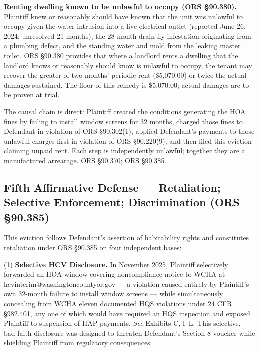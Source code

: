 \documentclass[12pt,letterpaper]{article}
\begin{document}
\textbf{Renting dwelling known to be unlawful to occupy (ORS \S90.380).} Plaintiff knew or reasonably should have known that the unit was unlawful to occupy given the water intrusion into a live electrical outlet (reported June 26, 2024; unresolved 21 months), the 28-month drain fly infestation originating from a plumbing defect, and the standing water and mold from the leaking master toilet. ORS \S90.380 provides that where a landlord rents a dwelling that the landlord knows or reasonably should know is unlawful to occupy, the tenant may recover the greater of two months' periodic rent (\$5,070.00) or twice the actual damages sustained. The floor of this remedy is \$5,070.00; actual damages are to be proven at trial.

The causal chain is direct: Plaintiff created the conditions generating the HOA fines by failing to install window screens for 32 months, charged those fines to Defendant in violation of ORS \S90.302(1), applied Defendant's payments to those unlawful charges first in violation of ORS \S90.220(9), and then filed this eviction claiming unpaid rent. Each step is independently unlawful; together they are a manufactured arrearage. ORS \S90.370; ORS \S90.385.

\subsection{Fifth Affirmative Defense --- Retaliation; Selective Enforcement; Discrimination (ORS \S90.385)}

This eviction follows Defendant's assertion of habitability rights and constitutes retaliation under ORS \S90.385 on four independent bases:

(1) \textbf{Selective HCV Disclosure.} In November 2025, Plaintiff selectively forwarded an HOA window-covering noncompliance notice to WCHA at hcvinterim@washingtoncountyor.gov --- a violation caused entirely by Plaintiff's own 32-month failure to install window screens --- while simultaneously concealing from WCHA eleven documented HQS violations under 24 CFR \S982.401, any one of which would have required an HQS inspection and exposed Plaintiff to suspension of HAP payments. \textit{See} Exhibits C, I--L. This selective, bad-faith disclosure was designed to threaten Defendant's Section 8 voucher while shielding Plaintiff from regulatory consequences.
\end{document}
